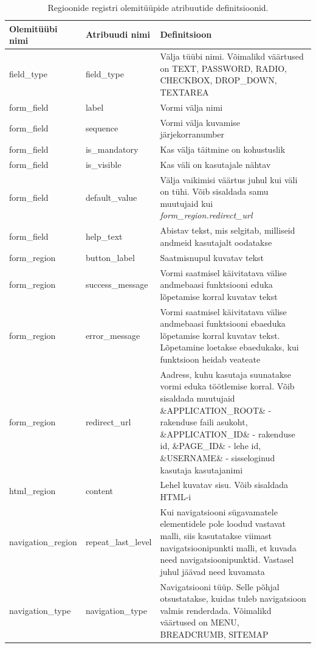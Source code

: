 \documentclass[a4paper,12pt]{article} %
\begin{document}
\begin{table}[H]
\centering
\caption{Regioonide registri olemitüüpide atribuutide definitsioonid.}
\label{table_er_regioonide_registri_olemitüüpide_atribuutide_definitsioonid}
\begin{tabular}{|p{3cm}|p{3cm}|p{9cm}|}
\hline
\rowcolor{rowgray}
Olemitüübi nimi & Atribuudi nimi & Definitsioon \\ \hline
field\_type & field\_type & Välja tüübi nimi. Võimalikd väärtused on TEXT, PASSWORD, RADIO, CHECKBOX, DROP\_DOWN, TEXTAREA \\ \hline
form\_field & label & Vormi välja nimi \\ \hline
form\_field & sequence & Vormi välja kuvamise järjekorranumber \\ \hline
form\_field & is\_mandatory & Kas välja täitmine on kohustuslik \\ \hline
form\_field & is\_visible & Kas väli on kasutajale nähtav \\ \hline
form\_field & default\_value & Välja vaikimisi väärtus juhul kui väli on tühi. Võib sisaldada samu muutujaid kui \textit{form\_region.redirect\_url} \\ \hline
form\_field & help\_text & Abistav tekst, mis selgitab, milliseid andmeid kasutajalt oodatakse \\ \hline
form\_region & button\_label & Saatmisnupul kuvatav tekst \\ \hline
form\_region & success\_message & Vormi saatmisel käivitatava välise andmebaasi funktsiooni eduka lõpetamise korral kuvatav tekst \\ \hline
form\_region & error\_message & Vormi saatmisel käivitatava välise andmebaasi funktsiooni ebaeduka lõpetamise korral kuvatav tekst. Lõpetamine loetakse ebaedukaks, kui funktsioon heidab veateate  \\ \hline
form\_region & redirect\_url & Aadress, kuhu kasutaja suunatakse vormi eduka töötlemise korral. Võib sisaldada muutujaid \&APPLICATION\_ROOT\& - rakenduse faili asukoht, \&APPLICATION\_ID\& - rakenduse id, \&PAGE\_ID\& - lehe id, \&USERNAME\& - sisseloginud kasutaja kasutajanimi\\ \hline
html\_region & content & Lehel kuvatav sisu. Võib sisaldada HTML-i \\ \hline
navigation\_region & repeat\_last\_level & Kui navigatsiooni sügavamatele elementidele pole loodud vastavat malli, siis kasutatakse viimast navigatsioonipunkti malli, et kuvada need navigatsioonipunktid. Vastasel juhul jäävad need kuvamata  \\ \hline
navigation\_type & navigation\_type & Navigatsiooni tüüp. Selle põhjal otsustatakse, kuidas tuleb navigatsioon valmis renderdada. Võimalikd väärtused on MENU, BREADCRUMB, SITEMAP \\ \hline

\end{tabular}
\end{table}
\end{document}
